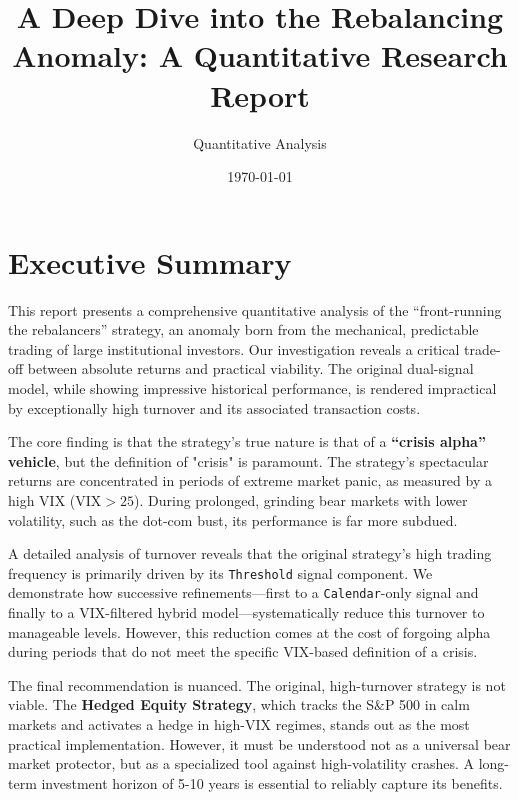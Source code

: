 \documentclass{article}
\title{A Deep Dive into the Rebalancing Anomaly: A Quantitative Research Report}
\author{Quantitative Analysis}
\date{\today}
\begin{document}
\maketitle

\tableofcontents
\newpage

\section*{Executive Summary}
This report presents a comprehensive quantitative analysis of the ``front-running the rebalancers'' strategy, an anomaly born from the mechanical, predictable trading of large institutional investors. Our investigation reveals a critical trade-off between absolute returns and practical viability. The original dual-signal model, while showing impressive historical performance, is rendered impractical by exceptionally high turnover and its associated transaction costs.

The core finding is that the strategy's true nature is that of a \textbf{``crisis alpha'' vehicle}, but the definition of "crisis" is paramount. The strategy's spectacular returns are concentrated in periods of extreme market panic, as measured by a high VIX ($\text{VIX} > 25$). During prolonged, grinding bear markets with lower volatility, such as the dot-com bust, its performance is far more subdued.

A detailed analysis of turnover reveals that the original strategy's high trading frequency is primarily driven by its \texttt{Threshold} signal component. We demonstrate how successive refinements---first to a \texttt{Calendar}-only signal and finally to a VIX-filtered hybrid model---systematically reduce this turnover to manageable levels. However, this reduction comes at the cost of forgoing alpha during periods that do not meet the specific VIX-based definition of a crisis.

The final recommendation is nuanced. The original, high-turnover strategy is not viable. The \textbf{Hedged Equity Strategy}, which tracks the S\&P 500 in calm markets and activates a hedge in high-VIX regimes, stands out as the most practical implementation. However, it must be understood not as a universal bear market protector, but as a specialized tool against high-volatility crashes. A long-term investment horizon of 5-10 years is essential to reliably capture its benefits.

\vspace{1em}
\hrulefill
\end{document}
